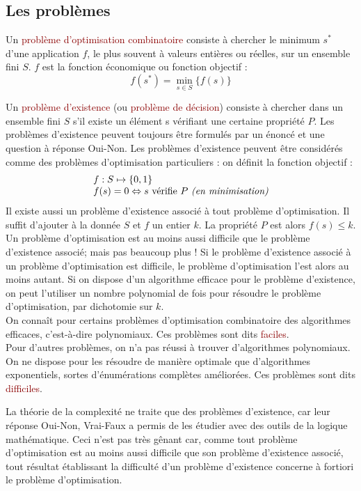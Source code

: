 \documentclass{article}
\newcommand{\red}[1]{\textcolor{darkred}{#1}}
\begin{document}
\subsection{Les problèmes}

Un \red{problème d’optimisation combinatoire} consiste à chercher le minimum $s^*$ d’une application $f$, le plus souvent à valeurs entières ou réelles, sur un ensemble fini $S$. 
$f$ est la fonction économique ou fonction objectif : $$f(s^*) = \min_{s\in S}\{f(s)\}$$

Un \red{problème d’existence} (ou \red{problème de décision}) consiste à chercher dans un ensemble fini $S$ s’il existe un élément s vérifiant une certaine propriété $P$. Les 
problèmes d’existence peuvent toujours être formulés par un énoncé et une question à réponse Oui-Non. Les problèmes d’existence peuvent être considérés comme des
problèmes d’optimisation particuliers : on définit la fonction objectif : \[
\begin{array}{l}
f:S\mapsto \{0,1\} \\
f(s) = 0 \Leftrightarrow s \text{ vérifie } P \text{ \textit{(en minimisation)}}
\end{array}
\]
Il existe aussi un problème d’existence associé à tout problème d’optimisation. Il suffit d’ajouter à la donnée $S$ et $f$ un entier $k$. La propriété $P$ est alors $f(s) \leq k$.
Un problème d’optimisation est au moins aussi difficile que le problème d’existence associé; mais pas beaucoup plus ! Si le problème d’existence associé à un problème d’optimisation 
est difficile, le problème d’optimisation l’est alors au moins autant. Si on dispose d’un algorithme efficace pour le problème d’existence, on peut l’utiliser un nombre polynomial de 
fois pour résoudre le problème d’optimisation, par dichotomie sur $k$. \\
On connaît pour certains problèmes d’optimisation combinatoire des algorithmes efficaces, c’est-à-dire polynomiaux. Ces problèmes sont dits \red{faciles}. \\
Pour d’autres problèmes, on n’a pas réussi à trouver d’algorithmes polynomiaux. On ne dispose pour les résoudre de manière optimale que d’algorithmes exponentiels, sortes 
d’énumérations complètes améliorées. Ces problèmes sont dits \red{difficiles}.

La théorie de la complexité ne traite que des problèmes d’existence, car leur réponse Oui-Non, Vrai-Faux a permis de les étudier avec des outils de la logique mathématique. Ceci 
n’est pas très gênant car, comme tout problème d’optimisation est au moins aussi difficile que son problème d’existence associé, tout résultat établissant la difficulté d’un problème 
d’existence concerne à fortiori le problème d’optimisation.\\
\end{document}
